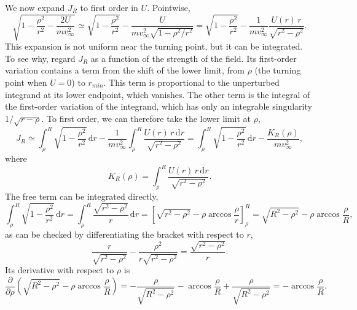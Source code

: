 \begin{problem}[title={Deriving the small-angle scattering formula}]
{We now expand $J_R$ to first order in $U$. Pointwise,
\begin{equation*}
    \sqrt{1 - \frac{\rho^2}{r^2} - \frac{2U}{mv_\infty^2}} \simeq \sqrt{1 - \frac{\rho^2}{r^2}} - \frac{U}{mv_\infty^2\sqrt{1 - \rho^2/r^2}} = \sqrt{1 - \frac{\rho^2}{r^2}} - \frac{1}{mv_\infty^2}\frac{U(r)\,r}{\sqrt{r^2 - \rho^2}}.
\end{equation*}
This expansion is not uniform near the turning point, but it can be integrated. To see why, regard $J_R$ as a function of the strength of the field. Its first-order variation contains a term from the shift of the lower limit, from $\rho$ (the turning point when $U = 0$) to $r_{min}$. This term is proportional to the unperturbed integrand at its lower endpoint, which vanishes. The other term is the integral of the first-order variation of the integrand, which has only an integrable singularity $1/\sqrt{r - \rho}$. To first order, we can therefore take the lower limit at $\rho$,
\begin{equation*}
    J_R \simeq \int_\rho^R \sqrt{1 - \frac{\rho^2}{r^2}}\,\mathrm{d}r - \frac{1}{mv_\infty^2}\int_\rho^R \frac{U(r)\,r\,\mathrm{d}r}{\sqrt{r^2 - \rho^2}} = \int_\rho^R \sqrt{1 - \frac{\rho^2}{r^2}}\,\mathrm{d}r - \frac{K_R(\rho)}{mv_\infty^2},
\end{equation*}
where
\begin{equation*}
    K_R(\rho) = \int_\rho^R \frac{U(r)\,r\,\mathrm{d}r}{\sqrt{r^2 - \rho^2}}.
\end{equation*}
The free term can be integrated directly,
\begin{equation*}
    \int_\rho^R \sqrt{1 - \frac{\rho^2}{r^2}}\,\mathrm{d}r = \int_\rho^R \frac{\sqrt{r^2 - \rho^2}}{r}\,\mathrm{d}r = \left[ \sqrt{r^2 - \rho^2} - \rho\arccos{\frac{\rho}{r}} \right]_\rho^R = \sqrt{R^2 - \rho^2} - \rho\arccos{\frac{\rho}{R}},
\end{equation*}
as can be checked by differentiating the bracket with respect to $r$,
\begin{equation*}
    \frac{r}{\sqrt{r^2 - \rho^2}} - \frac{\rho^2}{r\sqrt{r^2 - \rho^2}} = \frac{\sqrt{r^2 - \rho^2}}{r}.
\end{equation*}
Its derivative with respect to $\rho$ is
\begin{equation*}
    \frac{\partial}{\partial\rho}\left( \sqrt{R^2 - \rho^2} - \rho\arccos{\frac{\rho}{R}} \right) = -\frac{\rho}{\sqrt{R^2 - \rho^2}} - \arccos{\frac{\rho}{R}} + \frac{\rho}{\sqrt{R^2 - \rho^2}} = -\arccos{\frac{\rho}{R}}.
\end{equation*}
}
\end{problem}
